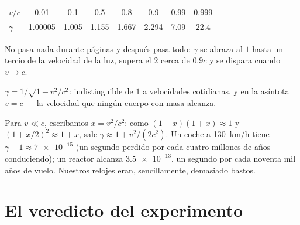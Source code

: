 \begin{example}\label{ex:g12:special-relativity:gammatable}
\begin{center}\small
\begin{tabular}{lccccccc}
$v/c$    & 0.01     & 0.1   & 0.5   & 0.8   & 0.9   & 0.99 & 0.999\\
$\gamma$ & 1.00005 & 1.005 & 1.155 & 1.667 & 2.294 & 7.09 & 22.4
\end{tabular}
\end{center}
No pasa nada durante páginas y después pasa todo: $\gamma$ se abraza al $1$ hasta un
tercio de la velocidad de la luz, supera el $2$ cerca de $0.9c$ y se dispara cuando
$v \to c$.
\end{example}

\begin{omfigure}

{\small $\gamma = 1/\sqrt{1 - v^2/c^2}$: indistinguible de $1$ a velocidades
cotidianas, y  en la asíntota $v = c$ --- la velocidad que ningún cuerpo con
masa alcanza.}
\end{omfigure}

\begin{remark}\label{rem:g12:special-relativity:everyday}
Para $v \ll c$, escribamos $x = v^2/c^2$: como $(1-x)(1+x) \approx 1$ y
$(1 + x/2)^2 \approx 1 + x$, sale $\gamma \approx 1 + v^2/(2c^2)$. Un coche a
\qty{130}{km/h} tiene $\gamma - 1 \approx \num{7e-15}$ (un segundo perdido por cada
cuatro millones de años conduciendo); un reactor alcanza $\num{3.5e-13}$, un segundo
por cada noventa mil años de vuelo. Nuestros relojes eran, sencillamente, demasiado
bastos.
\end{remark}

\section{El veredicto del experimento}

